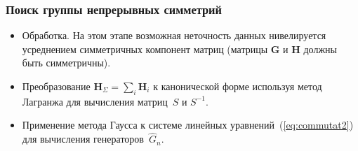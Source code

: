 \begin{frame}
    \frametitle{Поиск группы непрерывных симметрий}
    \begin{itemize}
      \item Обработка. На этом этапе возможная неточность данных нивелируется усреднением симметричных компонент матриц (матрицы $\textbf{G}$ и $\textbf{H}$ должны быть симметричны).
      \item %
      Преобразование $ {\textbf{H}}_{\Sigma} = \sum_{i} \textbf{H}_i$ к канонической форме используя метод Лагранжа для вычисления матриц~$S$ и $S^{-1} $.
      \item Применение метода Гаусса к системе линейных уравнений~(\ref{eq:commutat2}) для вычисления генераторов~$\hat{G}_n$.
    \end{itemize}
\end{frame}
